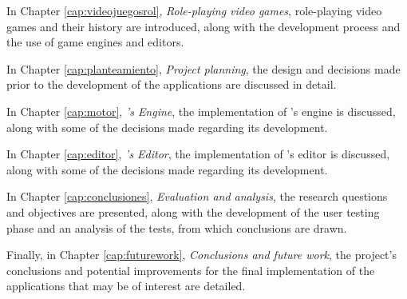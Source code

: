 \medskip

In Chapter \ref{cap:videojuegosrol}, \textit{Role-playing video games}, role-playing video games and their history are introduced, along with the development process and the use of game engines and editors.

\medskip

In Chapter \ref{cap:planteamiento}, \textit{Project planning}, the design and decisions made prior to the development of the applications are discussed in detail.

\medskip

In Chapter \ref{cap:motor}, \textit{\baker's Engine}, the implementation of \baker's engine is discussed, along with some of the decisions made regarding its development.
\medskip

In Chapter \ref{cap:editor}, \textit{\baker's Editor}, the implementation of \baker's editor is discussed, along with some of the decisions made regarding its development.

\medskip

In Chapter \ref{cap:conclusiones}, \textit{Evaluation and analysis}, the research questions and objectives are presented, along with the development of the user testing phase and an analysis of the tests, from which conclusions are drawn.

\medskip

Finally, in Chapter \ref{cap:futurework}, \textit{Conclusions and future work}, the project's conclusions and potential improvements for the final implementation of the applications that may be of interest are detailed.








